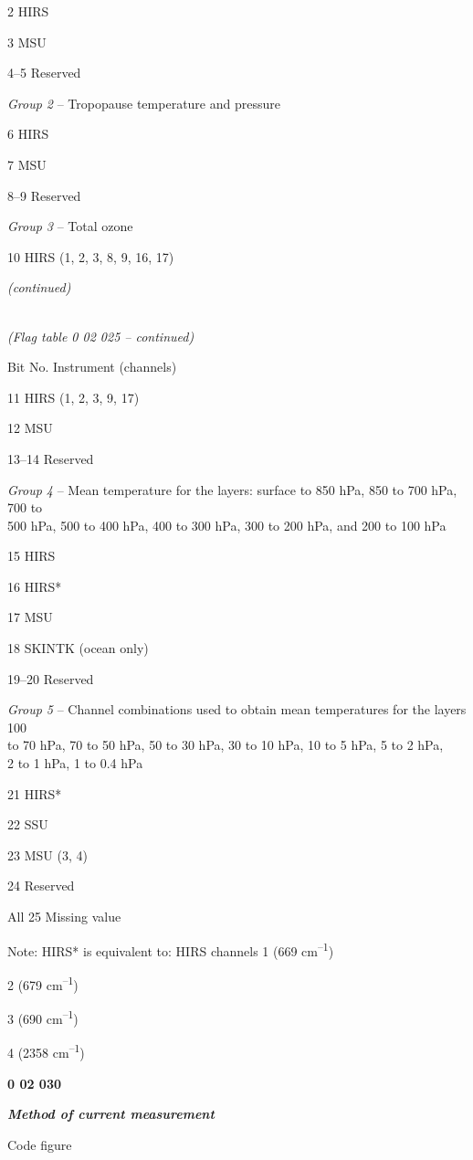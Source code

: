 2 HIRS

3 MSU

4--5 Reserved

\emph{Group 2} -- Tropopause temperature and pressure

6 HIRS

7 MSU

8--9 Reserved

\emph{Group 3} -- Total ozone

10 HIRS (1, 2, 3, 8, 9, 16, 17)

\emph{(continued)}

\emph{\\
} \emph{(Flag table 0 02 025 -- continued)}

Bit No. Instrument (channels)

11 HIRS (1, 2, 3, 9, 17)

12 MSU

13--14 Reserved

\emph{Group 4} -- Mean temperature for the layers: surface to 850 hPa, 850 to 700 hPa, 700 to\\
500 hPa, 500 to 400 hPa, 400 to 300 hPa, 300 to 200 hPa, and 200 to 100 hPa

15 HIRS

16 HIRS*

17 MSU

18 SKINTK (ocean only)

19--20 Reserved

\emph{Group 5} -- Channel combinations used to obtain mean temperatures for the layers 100\\
to 70 hPa, 70 to 50 hPa, 50 to 30 hPa, 30 to 10 hPa, 10 to 5 hPa, 5 to 2 hPa,\\
2 to 1 hPa, 1 to 0.4 hPa

21 HIRS*

22 SSU

23 MSU (3, 4)

24 Reserved

All 25 Missing value

Note: HIRS* is equivalent to: HIRS channels 1 (669 cm\textsuperscript{--1})

2 (679 cm\textsuperscript{--1})

3 (690 cm\textsuperscript{--1})

4 (2358 cm\textsuperscript{--1})

\textbf{0 02 030}

\emph{\textbf{Method of current measurement}}

Code figure

